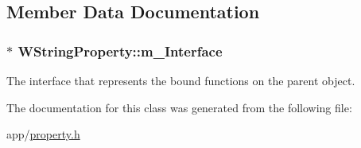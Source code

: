\subsection{Member Data Documentation}
\hypertarget{class_w_string_property_a2a678d70f25fed457ee88e4b1ff85b68}{
\subsubsection[{m\-\_\-\-Interface}]{$\ast$ W\-String\-Property\-::m\-\_\-\-Interface\hspace{0.3cm}{\ttfamily [protected]}}}\label{class_w_string_property_a2a678d70f25fed457ee88e4b1ff85b68}
The interface that represents the bound functions on the parent object. 

The documentation for this class was generated from the following file\-:\begin{DoxyCompactItemize}
\item 
app/\hyperlink{property_8h}{property.\-h}\end{DoxyCompactItemize}

